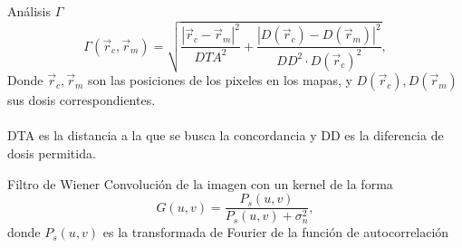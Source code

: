 \documentclass[12pt]{beamer}
\begin{document}
\begin{frame}{Análisis $\Gamma$}
\begin{equation*}
\Gamma(\vec{r}_c,\vec{r}_m)=\sqrt{\frac{|\vec{r}_c-\vec{r}_m|^2}{DTA^2}+\frac{|D(\vec{r}_c)-D(\vec{r}_m)|^2}{DD^2\cdot D(\vec{r}_c)^2}},
\end{equation*}
Donde $\vec{r}_c,\vec{r}_m$ son las posiciones de los pixeles en los mapas, y $D(\vec{r}_c),D(\vec{r}_m)$ sus dosis correspondientes.\\~\\

DTA es la distancia a la que se busca la concordancia y DD es la diferencia de dosis permitida.


\end{frame}

\begin{frame}{Filtro de Wiener}
Convolución de la imagen con un kernel de la forma
\begin{equation*}
	G(u,v)=\frac{P_s(u,v)}{P_s(u,v)+\sigma_n^2},
\end{equation*}
donde $P_s(u,v)$ es la transformada de Fourier de la función de autocorrelación

\end{frame}
\end{document}
